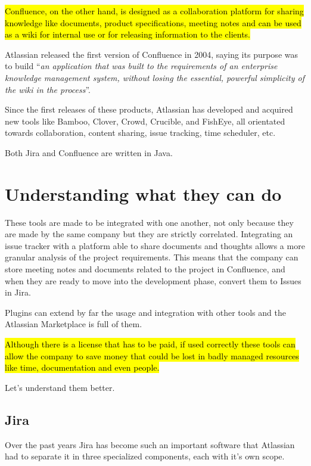 \hl{Confluence, on the other hand, is designed as a collaboration platform for sharing knowledge like documents, product specifications, meeting notes and can be used as a wiki for internal use or for releasing information to the clients.}

Atlassian released the first version of Confluence in 2004, saying its purpose was to build ``\textit{an application that was built to the requirements of an enterprise knowledge management system, without losing the essential, powerful simplicity of the wiki in the process}''.

Since the first releases of these products, Atlassian has developed and acquired new tools like Bamboo, Clover, Crowd, Crucible, and FishEye, all orientated towards collaboration, content sharing, issue tracking, time scheduler, etc.

Both Jira and Confluence are written in Java.

\section{Understanding what they can do}
	These tools are made to be integrated with one another, not only because they are made by the same company but they are strictly correlated.
	Integrating an issue tracker with a platform able to share documents and thoughts allows a more granular analysis of the project requirements.
	This means that the company can store meeting notes and documents related to the project in Confluence, and when they are ready to move into the development phase, convert them to Issues in Jira.

	Plugins can extend by far the usage and integration with other tools and the Atlassian Marketplace is full of them.
	
	\hl{Although there is a license that has to be paid, if used correctly these tools can allow the company to save money that could be lost in badly managed resources like time, documentation and even people.}

	Let's understand them better.
	
	\subsection{Jira}
	
		Over the past years Jira has become such an important software that Atlassian had to separate it in three specialized components, each with it's own scope.
		

